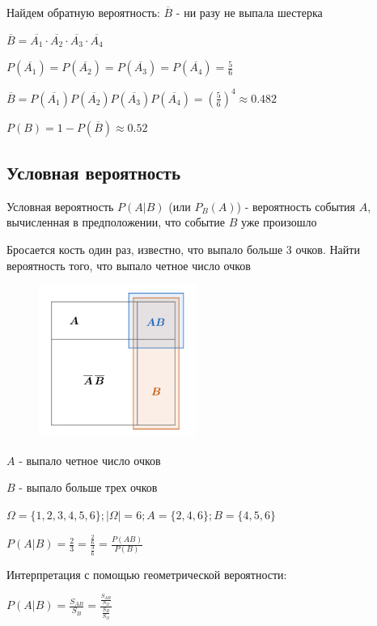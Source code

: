 \documentclass[12pt]{article}
\begin{document}
    Найдем обратную вероятность: $\overline{B}$ - ни разу не выпала шестерка

    $\overline{B} = \overline{A_1} \cdot \overline{A_2} \cdot \overline{A_3} \cdot \overline{A_4}$

    $P(\overline{A_1}) = P(\overline{A_2}) = P(\overline{A_3}) = P(\overline{A_4}) = \frac{5}{6}$

    $\overline{B} = P(\overline{A_1}) P(\overline{A_2}) P(\overline{A_3}) P(\overline{A_4}) = \left(\frac{5}{6}\right)^4 \approx 0.482$

    $P(B) = 1 - P(\overline{B}) \approx 0.52$


    \subsection{Условная вероятность}

    Условная вероятность $P(A|B)$ (или $P_B(A)$) - вероятность события $A$, вычисленная в предположении, что событие $B$ уже произошло

    \Ex Бросается кость один раз, известно, что выпало больше 3 очков. Найти вероятность того, что выпало четное число очков

    \smallvspace

    \begin{minipage}{\linewidth}
        \begin{figure}
            \begin{center}
                \includegraphics[height=5cm]{probtheory/images/probtheory_2024_09_17_1}
            \end{center}
        \end{figure}

        $A$ - выпало четное число очков

        $B$ - выпало больше трех очков

        $\Omega = \{1, 2, 3, 4, 5, 6\}; |\Omega| = 6; A = \{2, 4, 6\}; B = \{4, 5, 6\}$

        $P(A|B) = \frac{2}{3} = \frac{\frac{2}{6}}{\frac{3}{6}} = \frac{P(AB)}{P(B)}$


        Интерпретация с помощью геометрической вероятности:

        $P(A|B) = \frac{S_{AB}}{S_B} = \frac{\frac{S_{AB}}{S_\Omega}}{\frac{S_B}{S_\Omega}}$
    \end{minipage}
\end{document}
